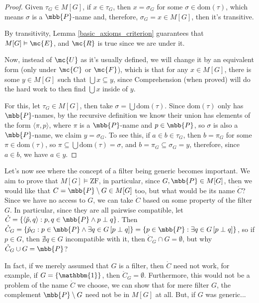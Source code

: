 \begin{proof}
    Given $\tau_G\in M[G]$, if $x\in\tau_G$, then $x=\sigma_G$ for some $\sigma\in\text{dom}(\tau)$, which means $\sigma$ is a $\mbb{P}$-name and, therefore, $\sigma_G=x\in M[G]$, then it's transitive.

    By transitivity, Lemma \ref{basic_axioms_criterion} guarantees that $M[G]\vDash\mc{E}$, and $\mc{R}$ is true since we are under it.

    Now, instead of $\mc{U}$ as it's usually defined, we will change it by an equivalent form (only under $\mc{C}$ or $\mc{F}$), which is that for any $x\in M[G]$, there is some $y\in M[G]$ such that $\bigcup x\subseteq y$, since Comprehension (when proved) will do the hard work to then find $\bigcup x$ inside of $y$.

    For this, let $\tau_G\in M[G]$, then take $\sigma=\bigcup\text{dom}(\tau)$. Since $\text{dom}(\tau)$ only has $\mbb{P}$-names, by the recursive definition we know their union has elements of the form $\langle\pi,p\rangle$, where $\pi$ is a $\mbb{P}$-name and $p\in\mbb{P}$, so $\sigma$ is also a $\mbb{P}$-name, we claim $y=\sigma_G$. To see this, if $a\in b\in\tau_G$, then $b=\pi_G$ for some $\pi\in\text{dom}(\tau)$, so $\pi\subseteq\bigcup\text{dom}(\tau)=\sigma$, and $b=\pi_G\subseteq\sigma_G=y$, therefore, since $a\in b$, we have $a\in y$.
\end{proof}

Let's now see where the concept of a filter being generic becomes important. We aim to prove that $M[G]\vDash\text{ZF}$, in particular, since $G,\mbb{P}\in M[G]$, then we would like that $C=\mbb{P}\setminus G\in M[G]$ too, but what would be its name $\mathring{C}$? Since we have no access to $G$, we can take $\mathring{C}$ based on some property of the filter $G$. In particular, since they are all pairwise compatible, let $\mathring{C}=\{\langle\check{p},q\rangle:p,q\in\mbb{P}\wedge p\perp q\}$. Then $\mathring{C}_G=\{\check{p}_G:p\in\mbb{P}\wedge\exists q\in G\,[p\perp q]\}=\{p\in\mbb{P}:\exists q\in G\,[p\perp q]\}$, so if $p\in G$, then $\nexists q\in G$ incompatible with it, then $\mathring{C}_G\cap G=\emptyset$, but why $\mathring{C}_G\cup G=\mbb{P}$?

In fact, if we merely assumed that $G$ is a filter, then $\mathring{C}$ need not work, for example, if $G=\{\mathbbm{1}\}$, then $\mathring{C}_G=\emptyset$. Furthermore, this would not be a problem of the name $\mathring{C}$ we choose, we can show that for mere filter $G$, the complement $\mbb{P}\setminus G$ need not be in $M[G]$ at all. But, if $G$ was generic...

